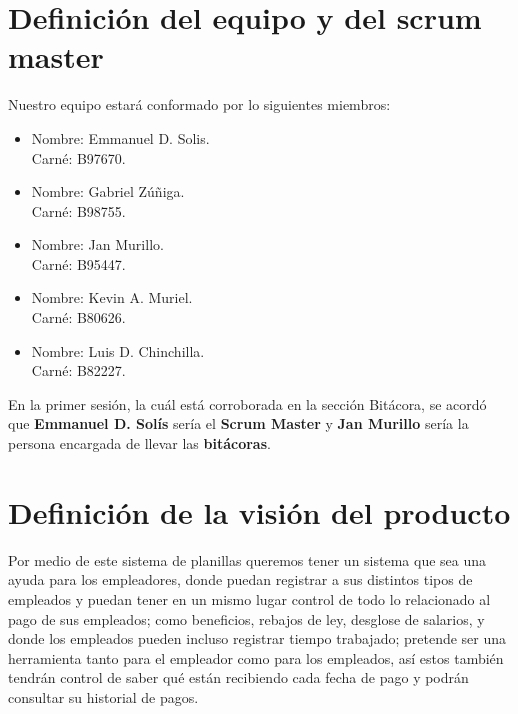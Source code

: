 \documentclass{article}
\begin{document}
\newpage


\newpage
\section{Definición del equipo y del scrum master}
Nuestro equipo estará conformado por lo siguientes miembros:
\begin{itemize}
  \item Nombre: Emmanuel D. Solis.\\Carné: B97670.
  \item Nombre: Gabriel Zúñiga.\\Carné: B98755.
  \item Nombre: Jan Murillo.\\Carné: B95447.
  \item Nombre: Kevin A. Muriel.\\Carné: B80626.
  \item Nombre: Luis D. Chinchilla.\\Carné: B82227.
\end{itemize}
En la primer sesión, la cuál está corroborada en la sección
Bitácora, se acordó que \textbf{Emmanuel D. Solís} sería el \textbf{Scrum Master}
y \textbf{Jan Murillo} sería la persona encargada de llevar las \textbf{bitácoras}.

\section{Definición de la visión del producto}
Por medio de este sistema de planillas queremos tener un sistema que sea
una ayuda para los empleadores, donde puedan registrar a sus distintos tipos
de empleados y puedan tener en un mismo lugar control de todo lo relacionado
al pago de sus empleados; como beneficios, rebajos de ley, desglose de salarios,
y donde los empleados pueden incluso registrar tiempo trabajado; pretende
ser una herramienta tanto para el empleador como para los empleados, así
estos también tendrán control de saber qué están recibiendo cada fecha de pago
y podrán consultar su historial de pagos.
\end{document}
